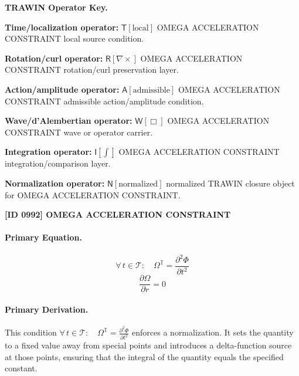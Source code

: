 \par\vspace{0.45\baselineskip}
\noindent\begin{minipage}[t]{\linewidth}
\begingroup
\small
\raggedright
\textbf{TRAWIN Operator Key.}\par
\noindent\textbf{Time/localization operator:} $\mathsf{T}\!\left[\mathrm{local}\right]$ OMEGA ACCELERATION CONSTRAINT local source condition.\par
\noindent\textbf{Rotation/curl operator:} $\mathsf{R}\!\left[\nabla\times\right]$ OMEGA ACCELERATION CONSTRAINT rotation/curl preservation layer.\par
\noindent\textbf{Action/amplitude operator:} $\mathsf{A}\!\left[\mathrm{admissible}\right]$ OMEGA ACCELERATION CONSTRAINT admissible action/amplitude condition.\par
\noindent\textbf{Wave/d'Alembertian operator:} $\mathsf{W}\!\left[\Box\right]$ OMEGA ACCELERATION CONSTRAINT wave or operator carrier.\par
\noindent\textbf{Integration operator:} $\mathsf{I}\!\left[\int\right]$ OMEGA ACCELERATION CONSTRAINT integration/comparison layer.\par
\noindent\textbf{Normalization operator:} $\mathsf{N}\!\left[\mathrm{normalized}\right]$ normalized TRAWIN closure object for OMEGA ACCELERATION CONSTRAINT.\par
\endgroup
\end{minipage}

\clearpage
\noindent\textbf{[ID 0992] OMEGA ACCELERATION CONSTRAINT}\par
\vspace{0.35em}
\paragraph{Primary Equation.}
\[
\forall\,t\in\mathcal{T}:\quad \Omega^{\mathbb{T}}=\frac{\partial^{2}\Phi}{\partial t^{2}}
\]
\[
\frac{\partial\Omega}{\partial r}=0
\]

\paragraph{Primary Derivation.}
This condition \( \forall\,t\in\mathcal{T}:\quad \Omega^{\mathbb{T}}=\frac{\partial^{2}\Phi}{\partial t^{2}} \) enforces a normalization. It sets the quantity to a fixed value away from special points and introduces a delta-function source at those points, ensuring that the integral of the quantity equals the specified constant.
